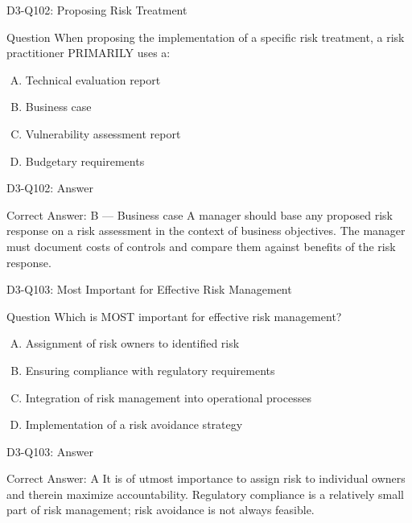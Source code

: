 \documentclass{beamer}
\begin{document}
	\begin{frame}{D3-Q102: Proposing Risk Treatment}
		\begin{block}{Question}
			When proposing the implementation of a specific risk treatment, a risk practitioner PRIMARILY uses a:
		\end{block}
		\begin{enumerate}[(A)]
			\item Technical evaluation report
			\item Business case
			\item Vulnerability assessment report
			\item Budgetary requirements
		\end{enumerate}
	\end{frame}
	\begin{frame}{D3-Q102: Answer}
		\begin{block}{Correct Answer: B --- Business case}
			A manager should base any proposed risk response on a risk assessment in the context of business objectives. The manager must document costs of controls and compare them against benefits of the risk response.
		\end{block}
	\end{frame}
	
	\begin{frame}{D3-Q103: Most Important for Effective Risk Management}
		\begin{block}{Question}
			Which is MOST important for effective risk management?
		\end{block}
		\begin{enumerate}[(A)]
			\item Assignment of risk owners to identified risk
			\item Ensuring compliance with regulatory requirements
			\item Integration of risk management into operational processes
			\item Implementation of a risk avoidance strategy
		\end{enumerate}
	\end{frame}
	\begin{frame}{D3-Q103: Answer}
		\begin{block}{Correct Answer: A}
			It is of utmost importance to assign risk to individual owners and therein maximize accountability. Regulatory compliance is a relatively small part of risk management; risk avoidance is not always feasible.
		\end{block}
	\end{frame}
	
\end{document}
